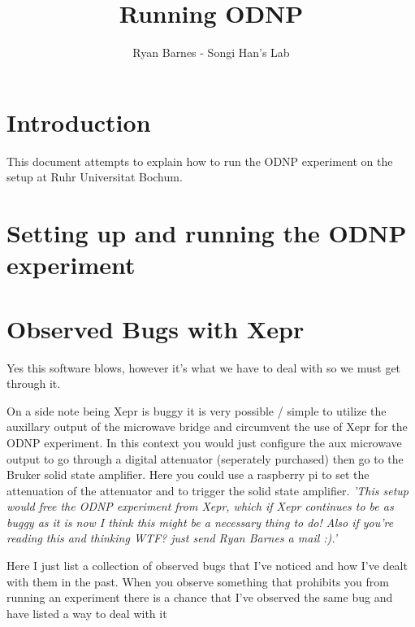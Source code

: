 \documentclass{article}
\title{Running ODNP}
\author{Ryan Barnes - Songi Han's Lab}
\newcommand{\fc}[1]{{\color{blue}\textit{'{#1}'}}}
\begin{document}
\maketitle



\section{Introduction}
This document attempts to explain how to run the ODNP experiment on the setup at Ruhr Universitat Bochum.





\section{Setting up and running the ODNP experiment}



\section{Observed Bugs with Xepr}
Yes this software blows, however it's what we have to deal with so we must get through it.

On a side note being Xepr is buggy it is very possible / simple to utilize the auxillary output of the microwave bridge and circumvent the use of Xepr for the ODNP experiment. In this context you would just configure the aux microwave output to go through a digital attenuator (seperately purchased) then go to the Bruker solid state amplifier. Here you could use a raspberry pi to set the attenuation of the attenuator and to trigger the solid state amplifier. \fc{This setup would free the ODNP experiment from Xepr, which if Xepr continues to be as buggy as it is now I think this might be a necessary thing to do! Also if you're reading this and thinking WTF? just send Ryan Barnes a mail :).}

Here I just list a collection of observed bugs that I've noticed and how I've dealt with them in the past. When you observe something that prohibits you from running an experiment there is a chance that I've observed the same bug and have listed a way to deal with it 
\end{document}
